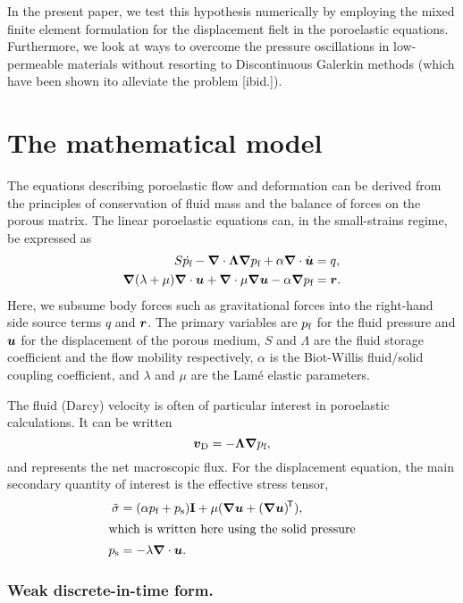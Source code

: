 In the present paper, we test this hypothesis numerically by employing the
mixed finite element formulation for the displacement fielt in the poroelastic
equations.
Furthermore, we look at ways to overcome the pressure oscillations in
low-permeable materials without resorting to Discontinuous Galerkin methods
(which have been shown ito alleviate the problem [ibid.]).

\section{The mathematical model}

The equations describing poroelastic flow and deformation can be derived from
the principles of conservation of fluid mass and the balance of forces on the
porous matrix.
%
The linear poroelastic equations can, in the small-strains regime, be
expressed as
%
\begin{align}
\label{eq:sim1}
S\dot{\Pf} - \nabla \cdot \Lambda \nabla \Pf + \alpha \nabla \cdot \dot{\U} &= q, \\
\label{eq:sim2}
\nabla (\lambda+\mu) \nabla \cdot \U + \nabla \cdot \mu \nabla \U
 -  \alpha \nabla \Pf &= \V{r}.
\end{align}
%
Here, we subsume body forces such as gravitational forces into the right-hand
side source terms $q$ and $\boldsymbol{r}$.
The primary variables are $p_{\text{f}}$ for the fluid pressure and $\boldsymbol{u}$ for the
displacement of the porous medium, $S$ and $\Lambda$ are the fluid storage
coefficient and the flow mobility respectively, $\alpha$ is the Biot-Willis fluid/solid
coupling coefficient, and $\lambda$ and $\mu$ are the Lam\'e elastic parameters.

The fluid (Darcy) velocity is often of particular interest in poroelastic
calculations.
It can be written
\begin{equation}
  \label{eq:vD}
  \vD= -\Lambda \nabla \Pf,
\end{equation}
and represents the net macroscopic flux.
%
For the displacement equation, the main secondary quantity of interest is the
effective stress tensor,
\begin{align}
  \label{eq:sigma}
  \tilde{\VV{\sigma}} &= (\alpha \Pf + \Ps) \VV{I} +
  \mu\VV{(\nabla \U + \T{(\nabla \U)})},\\
  \intertext{which is written here using the solid pressure}
  \label{eq:Ps}
  \Ps &= -\lambda \nabla \cdot \U.
\end{align}

\subsubsection*{Weak discrete-in-time form.}

